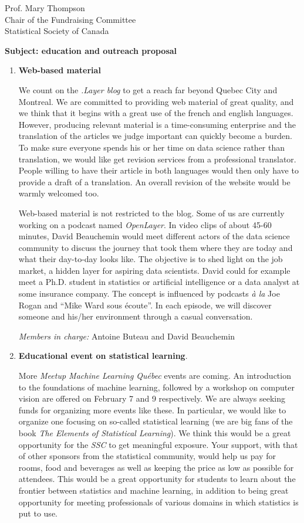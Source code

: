\documentclass[11pt, a4paper]{letter} %
\begin{document}
\begin{letter}{
	Prof. Mary Thompson\\
	Chair of the Fundraising Committee\\
	Statistical Society of Canada
	
	\bigskip
	\textbf{Subject: education and outreach proposal}%
}
\begin{enumerate}
	\bigskip
	\emph{Member in charge:} Stéphane Caron\\
	
	\item \textbf{Web-based material}
	
	\quad We count on the \emph{.Layer blog} to get a reach far beyond Quebec City and Montreal. We are committed to providing web material of great quality, and we think that it begins with a great use of the french and english languages. However, producing relevant material is a time-consuming enterprise and the translation of the articles we judge important can quickly become a burden. To make sure everyone spends his or her time on data science rather than translation, we would like get revision services from a professional translator. People willing to have their article in both languages would then only have to provide a draft of a translation. An overall revision of the website would be warmly welcomed too.
	
	\quad Web-based material is not restricted to the blog. Some of us are currently working on a podcast named \emph{OpenLayer}. In video clips of about 45-60 minutes, David Beauchemin would meet different actors of the data science community to discuss the journey that took them where they are today and what their day-to-day looks like. The objective is to shed light on the job market, a hidden layer for aspiring data scientists. David could for example meet a Ph.D. student in statistics or artificial intelligence or a data analyst at some insurance company. The concept is influenced by podcasts \emph{à la} Joe Rogan and ``Mike Ward sous écoute''. In each episode, we will discover someone and his/her environment through a casual conversation.
	
	\bigskip
	\emph{Members in charge:} Antoine Buteau and David Beauchemin\\
	
	\item \textbf{Educational event on statistical learning}.
	
	\quad More \emph{Meetup Machine Learning Québec} events are coming. An introduction to the foundations of machine learning, followed by a workshop on computer vision are offered on February 7 and 9 respectively. We are always seeking funds for organizing more events like these. In particular, we would like to organize one focusing on so-called statistical learning (we are big fans of the book \emph{The Elements of Statistical Learning}). We think this would be a great opportunity for the \emph{SSC} to get meaningful exposure. Your support, with that of other sponsors from the statistical community, would help us pay for rooms, food and beverages as well as keeping the price as low as possible for attendees. This would be a great opportunity for students to learn about the frontier between statistics and machine learning, in addition to being great opportunity for meeting professionals of various domains in which statistics is put to use.


\end{enumerate}
\end{letter}
\end{document}
